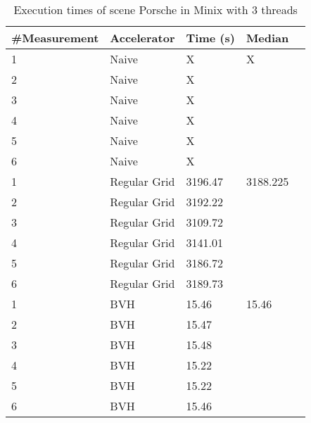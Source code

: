 \begin{table}[H]
	\small
	\begin{tabular}{|l|l|l|l|l|}
		\hline
		\#Measurement & Accelerator & Time (s) & Median \\ \hline
		1 & Naive & X & X \\ \hline
		2 & Naive & X & \\ \hline
		3 & Naive & X & \\ \hline
		4 & Naive & X & \\ \hline
		5 & Naive & X & \\ \hline
		6 & Naive & X & \\ \hline
		1 & Regular Grid & 3196.47 & 3188.225 \\ \hline
		2 & Regular Grid & 3192.22 & \\ \hline
		3 & Regular Grid & 3109.72 & \\ \hline
		4 & Regular Grid & 3141.01 & \\ \hline
		5 & Regular Grid & 3186.72 & \\ \hline
		6 & Regular Grid & 3189.73 & \\ \hline
		1 & BVH & 15.46 & 15.46 \\ \hline
		2 & BVH & 15.47 & \\ \hline
		3 & BVH & 15.48 & \\ \hline
		4 & BVH & 15.22 & \\ \hline
		5 & BVH & 15.22 & \\ \hline
		6 & BVH & 15.46 & \\ \hline
	\end{tabular}
	\label{Time}
	\caption{Execution times of scene Porsche in Minix with 3 threads}
\end{table}

